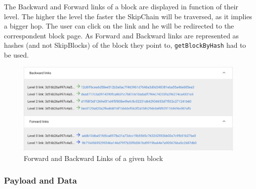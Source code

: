 \documentclass[11pt, a4paper, twoside, openright]{article} %
\begin{document}
{The Backward and Forward links of a block are displayed in function of their level. The higher the level the faster the SkipChain will be traversed, as it implies a bigger hop. The user can click on the link and he will be redirected to the correspondent block page. As Forward and Backward links are represented as hashes (and not SkipBlocks) of the block they point to, \verb|getBlockByHash| had to be used.
\begin{figure}[h]
    \centering
    \includegraphics[width=\textwidth]{Links.png}
    \caption{Forward and Backward Links of a given block}
\end{figure}
\subsubsection{Payload and Data}

}
\end{document}
